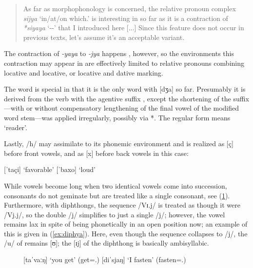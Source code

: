 \blockcquote[12]{becker:kafka:imperial}{As far as morphophonology is concerned,
the relative pronoun complex \textit{sijya} `in/at/on which.\Loc{}' is
interesting in so far as it is a contraction of \textit{*siyaya}
`\Rel{}-\Loc{}-\Loc{}' that I introduced here [...] Since this feature does not
occur in previous texts, let's assume it's an acceptable variant.}

The contraction of \textit{-yaya} to \textit{-jya} happens
, however, so the environments this contraction may appear in are
effectively limited to relative pronouns combining locative and locative, or
locative and dative marking.

The word  is special in that it is the only word
with  [dʒa] so far. Presumably it is derived from the verb
 with the agentive suffix , except the
shortening of the suffix---with or without compensatory lengthening of the
final vowel of the modified word stem---was applied irregularly, possibly via
*. The regular form  means `reader'.

Lastly, /h/ may assimilate to its phonemic environment and is realized as 
[ç] before front vowels, and as [x] before back vowels in this case:

\pex
	\a {} [ˈtaçi] `favorable'
	\a {} [ˈbaxo] `loud'
\xe

While vowels become long when two identical vowels come into succession,
consonants do not geminate but are treated like a single consonant, see
(\ref{ex:geminates}). Furthermore, with diphthongs, the
sequence /Vɪ.j/ is treated as though it were /Vj.j/, so the double /j/
simplifies to just a single /j/; however, the vowel remains lax in spite of
being phonetically in an open position now; an example of this is given in
(\ref{ex:diphya}). Here, even though the  sequence collapses to /j/,
the /u/ of  remains [ʊ]; the [ɪ\til{}j] of the diphthong is
basically ambisyllabic.

\begin{figure}[h]
\pex\label{ex:geminates}
	\a {} [taˈvaːŋ] `you get' 
		(get=\Ssg{}.\Aarg{})
	\a {} [diˈsjaŋ] `I fasten' 
		(fasten=\Fsg{}.\Aarg{})
\xe
\end{figure}

